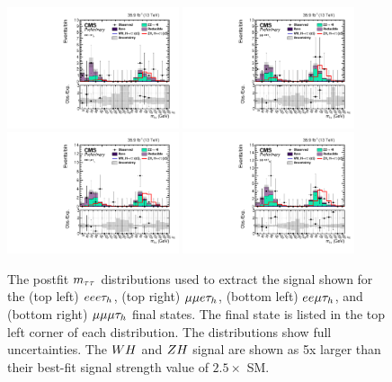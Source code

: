 \begin{figure}[h!]
 \begin{center}
  \includegraphics[width=0.45\textwidth]{higgs_to_taus_vh/plots/zh/eeet_postfit.pdf}
  \includegraphics[width=0.45\textwidth]{higgs_to_taus_vh/plots/zh/emmt_postfit.pdf}
  \includegraphics[width=0.45\textwidth]{higgs_to_taus_vh/plots/zh/eemt_postfit.pdf}
  \includegraphics[width=0.45\textwidth]{higgs_to_taus_vh/plots/zh/mmmt_postfit.pdf}
 \end{center}
 \caption{The postfit $m_{\tau\tau}$ distributions used to extract the signal shown
  for the (top left) $eee\tau_{h}$, (top right) $\mu\mu e\tau_{h}$, 
  (bottom left) $ee\mu\tau_{h}$, and (bottom right) $\mu\mu\mu\tau_{h}$
  final states. The final state is listed in the
  top left corner of each distribution.
  The distributions show full uncertainties.
  The $WH$ and $ZH$ signal are shown as 5x larger than their best-fit
  signal strength value of $2.5 \times$ SM.
 }
 \label{fig:zh_all_eight1}
\end{figure}

